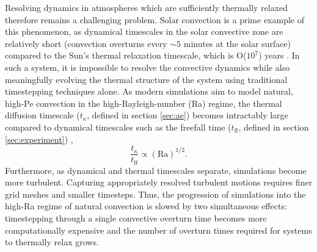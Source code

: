 \documentclass[aps, pre, onecolumn, nofootinbib, notitlepage, groupedaddress, amsfonts, amssymb, amsmath, longbibliography]{revtex4-1}
\begin{document}
Resolving dynamics in atmospheres which are sufficiently
thermally relaxed therefore remains a challenging problem.
Solar convection is a prime example of this phenomenon, as
dynamical timescales in the solar convective zone are relatively short 
(convection overturns every $\sim 5$ minutes at the solar surface)
compared to the Sun's thermal relaxation timescale, which is O($10^7$) years
\cite{stix2003}.  
In such a system, it is impossible to resolve the convective dynamics while also
meaningfully evolving the thermal structure of the system using
traditional timestepping techniques alone.
As modern simulations aim to model natural, high-Pe convection
in the high-Rayleigh-number (Ra) regime,
the thermal diffusion timescale ($t_{\kappa}$, defined in section \ref{sec:ae}) 
becomes intractably large compared to dynamical timescales 
such as the freefall time ($t_{\text{ff}}$, defined in section \ref{sec:experiment})
\cite{anders&brown2017}, 
\begin{equation}
\frac{t_{\kappa}}{t_{\text{ff}}} \propto (\text{Ra})^{1/2}.
\end{equation}
Furthermore, as dynamical and thermal timescales separate, 
simulations become more turbulent. Capturing appropriately resolved
turbulent motions requires finer grid meshes and smaller timesteps.
Thus, the progression of simulations into the high-Ra
regime of natural convection is slowed by two simultaneous effects: timestepping
through a single convective overturn time becomes more computationally expensive
and the number of overturn times required for systems to thermally relax
grows.
\end{document}
